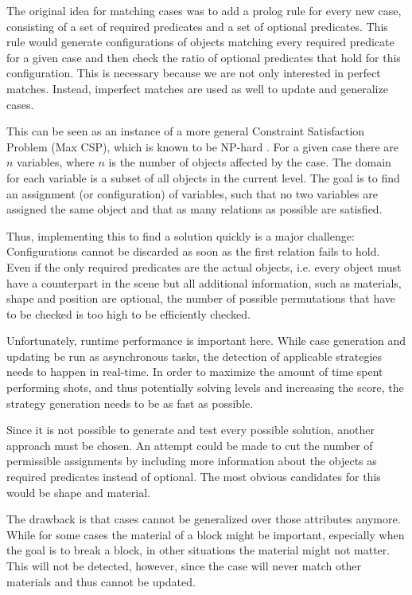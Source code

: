 The original idea for matching cases was to add a prolog rule for every new case, consisting of a set of required predicates and a set of optional predicates.
This rule would generate configurations of objects matching every required predicate for a given case and then check the ratio of optional predicates that hold for this configuration.
This is necessary because we are not only interested in perfect matches.
Instead, imperfect matches are used as well to update and generalize cases.

This can be seen as an instance of a more general Constraint Satisfaction Problem (Max CSP), which is known to be NP-hard \cite{Samorodnitsky2000APC}. For a given case there are $n$ variables, where $n$ is the number of objects affected by the case. 
The domain for each variable is a subset of all objects in the current level. 
The goal is to find an assignment (or configuration) of variables, such that no two variables are assigned the same object and that as many relations as possible are satisfied.

Thus, implementing this to find a solution quickly is a major challenge:
Configurations cannot be discarded as soon as the first relation fails to hold.
Even if the only required predicates are the actual objects, i.e. every object must have a counterpart in the scene but all additional information, such as materials, shape and position are optional, the number of possible permutations that have to be checked is too high to be efficiently checked.

Unfortunately, runtime performance is important here. 
While case generation and updating be run as asynchronous tasks, the detection of applicable strategies needs to happen in real-time.
In order to maximize the amount of time spent performing shots, and thus potentially solving levels and increasing the score, the strategy generation needs to be as fast as possible.

Since it is not possible to generate and test every possible solution, another approach must be chosen. An attempt could be made to cut the number of permissible assignments by including more information about the objects as required predicates instead of optional.
The most obvious candidates for this would be shape and material.

The drawback is that cases cannot be generalized over those attributes anymore. While for some cases the material of a block might be important, especially when the goal is to break a block, in other situations the material might not matter.
This will not be detected, however, since the case will never match other materials and thus cannot be updated.

